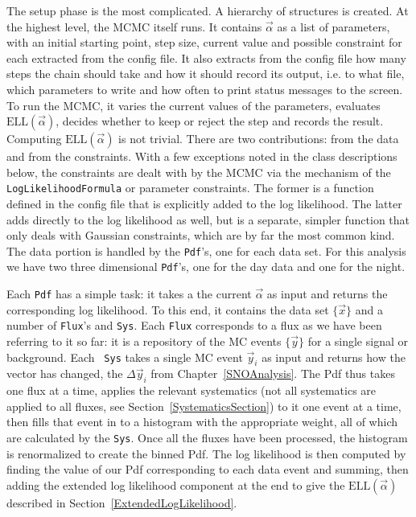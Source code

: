 The setup phase is the most complicated.  A hierarchy of structures is
created.  At the highest level, the MCMC itself runs.  It contains
$\vec{\alpha}$ as a list of parameters, with an initial starting
point, step size, current value and possible constraint for each
extracted from the config file.  It also extracts from the config file
how many steps the chain should take and how it should record its
output, i.e. to what file, which parameters to write and how often to
print status messages to the screen.  To run the MCMC, it varies the
current values of the parameters, evaluates
$\mathrm{ELL}(\vec{\alpha})$, decides whether to keep or reject the
step and records the result.  Computing $\mathrm{ELL}(\vec{\alpha})$
is not trivial.  There are two contributions: from the data and from
the constraints.  With a few exceptions noted in the class
descriptions below, the constraints are dealt with by the MCMC via the
mechanism of the {\tt LogLikelihoodFormula} or parameter constraints.
The former is a function defined in the config file that is explicitly
added to the log likelihood.  The latter adds directly to the log
likelihood as well, but is a separate, simpler function that only
deals with Gaussian constraints, which are by far the most common kind.  The
data portion is handled by the {\tt Pdf}'s, one for each data set.
For this analysis we have two three dimensional {\tt Pdf}'s, one for
the day data and one for the night.

Each {\tt Pdf} has a simple task: it takes a the current
$\vec{\alpha}$ as input and returns the corresponding log likelihood.
To this end, it contains the data set $\{\vec{x}\}$ and a number of
{\tt Flux}'s and {\tt Sys}.  Each {\tt Flux} corresponds to a flux as
we have been referring to it so far: it is a repository of the MC
events $\{\vec{y}\}$ for a single signal or background.  Each {\tt
  Sys} takes a single MC event $\vec{y}_i$ as input and returns how
the vector has changed, the $\Delta \vec{y}_i$ from \mbox{Chapter
  \ref{SNOAnalysis}}.  The Pdf thus takes one flux at a time, applies
the relevant systematics (not all systematics are applied to all
fluxes, see \mbox{Section \ref{SystematicsSection}}) to it one event
at a time, then fills that event in to a histogram with the
appropriate weight, all of which are calculated by the {\tt Sys}.
Once all the fluxes have been processed, the histogram is renormalized
to create the binned Pdf.  The log likelihood is then computed by
finding the value of our Pdf corresponding to each data event and
summing, then adding the extended log likelihood component at the end
to give the $\mathrm{ELL}(\vec{\alpha})$ described in \mbox{Section
  \ref{ExtendedLogLikelihood}}.

